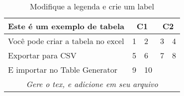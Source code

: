 \begin{table}[h!] %
\centering
\caption{Modifique a legenda e crie um label}
\label{tab1} %
\begin{tabular}{|l|l|l|l|l|}
\hline
\multicolumn{1}{|c|}{\textbf{Este é um exemplo de tabela}} & \multicolumn{2}{c|}{\textbf{C1}} & \multicolumn{2}{c|}{\textbf{C2}} \\ \hline
Você pode criar a tabela no excel                          & 1              & 2               & 3               & 4              \\ \hline
Exportar para CSV                                          & 5              & 6               & 7               & 8              \\ \hline
E importar no Table Generator                              & 9              & 10              &                 &                \\ \hline
\multicolumn{5}{|c|}{\textit{Gere o tex, e adicione em seu arquivo}}                                                             \\ \hline
\end{tabular}
\end{table}